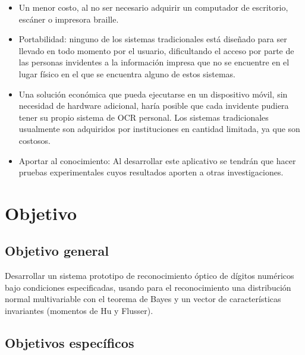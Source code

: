 \documentclass[a4paper, 11pt, oneside]{report}
\begin{document}
	\begin{itemize} 

	\item Un menor costo, al no ser necesario adquirir un computador de escritorio, escáner o impresora braille.

	\item Portabilidad: ninguno de los sistemas tradicionales está diseñado para ser llevado en todo momento por el usuario, dificultando el acceso por parte de las personas invidentes a la información impresa que no se encuentre en el lugar físico en el que se encuentra alguno de estos sistemas.
	
	\item Una solución económica que pueda ejecutarse en un dispositivo móvil, sin necesidad de hardware adicional, haría posible que cada invidente pudiera tener su propio sistema de OCR personal. Los sistemas tradicionales usualmente son adquiridos por instituciones en cantidad limitada, ya que son costosos.

	\item Aportar al conocimiento: Al desarrollar este aplicativo se tendrán que hacer pruebas experimentales cuyos resultados aporten a otras investigaciones.

	\end{itemize}
	
\section{Objetivo}
\label{sect:objective}
	
\subsection{Objetivo general}

Desarrollar un sistema prototipo de reconocimiento óptico de dígitos numéricos bajo condiciones especificadas, usando para el reconocimiento una distribución normal multivariable con el teorema de Bayes y un vector de características invariantes (momentos de Hu y Flusser).

\subsection{Objetivos específicos}
	
\end{document}
